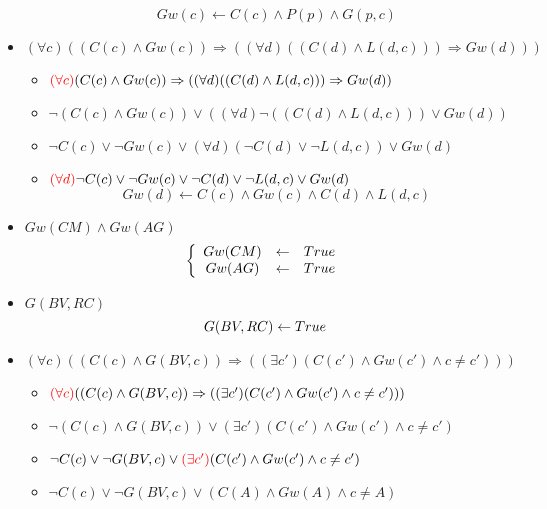 \documentclass[alternative-exam.tex]{subfiles}
\begin{document}
\begin{itemize}
\begin{itemize}
\[
Gw(c)\leftarrow C(c) \wedge P(p) \wedge G(p,c)\]
\end{itemize}
\item $(\forall c)(( C(c) \wedge Gw(c)) \Rightarrow ((\forall d)(( C(d) \wedge L(d,c)))\Rightarrow Gw(d)))$
\begin{itemize}
\item ${\color{red}(\forall c)}( C(c) \wedge Gw(c)) \Rightarrow ((\forall d)(( C(d) \wedge L(d,c)))\Rightarrow Gw(d))$

\item $\neg( C(c) \wedge Gw(c)) \vee ((\forall d)\neg(( C(d) \wedge L(d,c)))\vee Gw(d))$

\item $\neg C(c) \vee \neg Gw(c) \vee (\forall d)( \neg C(d) \vee \neg L(d,c))\vee Gw(d)$

\item ${\color{red}(\forall d)} \neg C(c) \vee \neg Gw(c) \vee \neg C(d) \vee \neg L(d,c)\vee Gw(d)$
\[
 Gw(d)\leftarrow
C(c) \wedge Gw(c) \wedge C(d) \wedge L(d,c) \]
\end{itemize}

\item $Gw(CM) \wedge Gw(AG)$
\[
\left\{
\begin{array}{c c c}
Gw(CM) &\leftarrow& True\\
Gw(AG) &\leftarrow& True\\
\end{array}
\right.
\]

\item $G(BV,RC)$
\[
G(BV,RC) \leftarrow True\\
\]

\item $(\forall c) ((C(c) \wedge G(BV,c)) \Rightarrow ((\exists c') (C(c') \wedge Gw(c') \wedge c \neq c')))$
\begin{itemize}
\item ${\color{red}(\forall c)}((C(c) \wedge G(BV,c)) \Rightarrow ((\exists c') (C(c') \wedge Gw(c') \wedge c \neq c')))$

\item $\neg (C(c) \wedge G(BV,c)) \vee (\exists c') (C(c') \wedge Gw(c') \wedge c \neq c')$

\item $\neg C(c) \vee \neg G(BV,c) \vee {\color{red} (\exists c')} (C(c') \wedge Gw(c') \wedge c \neq c')$

\item $\neg C(c) \vee \neg G(BV,c) \vee (C(A) \wedge Gw(A) \wedge c \neq A)$


\end{itemize}
\end{itemize}
\end{document}
